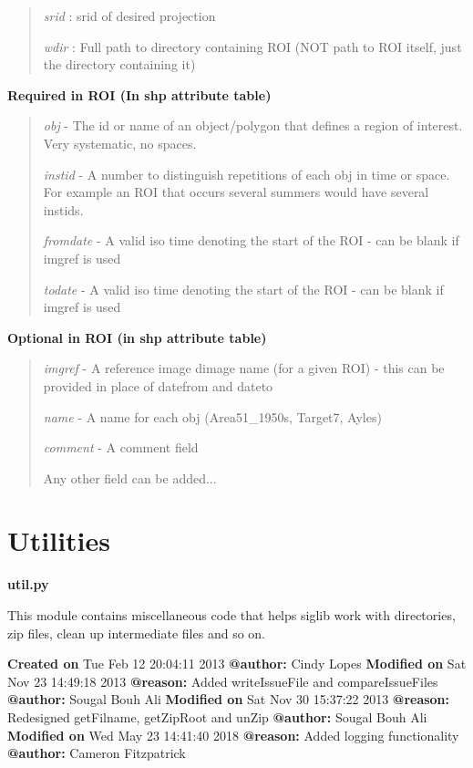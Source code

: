 \documentclass[letterpaper,10pt,openany,oneside]{sphinxmanual}
\begin{document}
\begin{fulllineitems}
\begin{fulllineitems}
\begin{quote}
\emph{srid}     : srid of desired projection

\emph{wdir}     : Full path to directory containing ROI (NOT path to ROI itself, just the directory containing it)
\end{quote}

\textbf{Required in ROI (In shp attribute table)}
\begin{quote}

\emph{obj}      - The id or name of an object/polygon that defines a region of interest. Very systematic, no spaces.

\emph{instid}   - A number to distinguish repetitions of each obj in time or space.  For example an ROI that occurs several summers would have several instids.

\emph{fromdate} - A valid iso time denoting the start of the ROI - can be blank if imgref is used

\emph{todate}   - A valid iso time denoting the start of the ROI - can be blank if imgref is used
\end{quote}

\textbf{Optional in ROI (in shp attribute table)}
\begin{quote}

\emph{imgref}   - A reference image dimage name (for a given ROI) - this can be provided in place of datefrom and dateto

\emph{name}     - A name for each obj (Area51\_1950s, Target7, Ayles)

\emph{comment}  - A comment field

Any other field can be added...
\end{quote}

\end{fulllineitems}


\end{fulllineitems}



\section{Utilities}
\label{code:module-Util}\label{code:utilities}
\textbf{util.py}

This module contains miscellaneous code that helps siglib work with directories, 
zip files, clean up intermediate files and so on.

\textbf{Created on} Tue Feb 12 20:04:11 2013 \textbf{@author:} Cindy Lopes
\textbf{Modified on} Sat Nov 23 14:49:18 2013 \textbf{@reason:} Added writeIssueFile and compareIssueFiles \textbf{@author:} Sougal Bouh Ali
\textbf{Modified on} Sat Nov 30 15:37:22 2013 \textbf{@reason:} Redesigned getFilname, getZipRoot and unZip \textbf{@author:} Sougal Bouh Ali
\textbf{Modified on} Wed May 23 14:41:40 2018 \textbf{@reason:} Added logging functionality \textbf{@author:} Cameron Fitzpatrick
\end{document}

